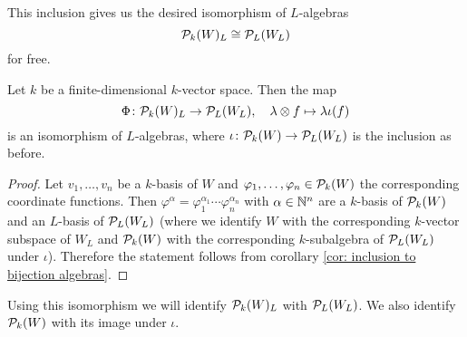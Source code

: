 This inclusion gives us the desired isomorphism of $L$-algebras
\[
        \mathcal{P}_k(W)_L
  \cong \mathcal{P}_L(W_L)
\]
for free.


\begin{prop}
  Let $k$ be a finite-dimensional $k$-vector space.
  Then the map
  \[
            \Phi
    \colon  \mathcal{P}_k(W)_L
    \to     \mathcal{P}_L(W_L),
    \quad   \lambda \otimes f
    \mapsto \lambda \iota(f)
  \]
  is an isomorphism of $L$-algebras, where $\iota \colon \mathcal{P}_k(W) \to \mathcal{P}_L(W_L)$ is the inclusion as before.
\end{prop}
\begin{proof}
  Let $v_1, \dotsc, v_n$ be a $k$-basis of $W$ and $\varphi_1, \dotsc, \varphi_n \in \mathcal{P}_k(W)$ the corresponding coordinate functions.
  Then $\varphi^\alpha = \varphi_1^{\alpha_1} \dotsm \varphi_n^{\alpha_n}$ with $\alpha \in \mathbb{N}^n$ are a $k$-basis of $\mathcal{P}_k(W)$ and an $L$-basis of $\mathcal{P}_L(W_L)$ (where we identify $W$ with the corresponding $k$-vector subspace of $W_L$ and $\mathcal{P}_k(W)$ with the corresponding $k$-subalgebra of $\mathcal{P}_L(W_L)$ under $\iota$).
  Therefore the statement follows from corollary \ref{cor: inclusion to bijection algebras}.
\end{proof}


Using this isomorphism we will identify $\mathcal{P}_k(W)_L$ with $\mathcal{P}_L(W_L)$.
We also identify $\mathcal{P}_k(W)$ with its image under $\iota$.


